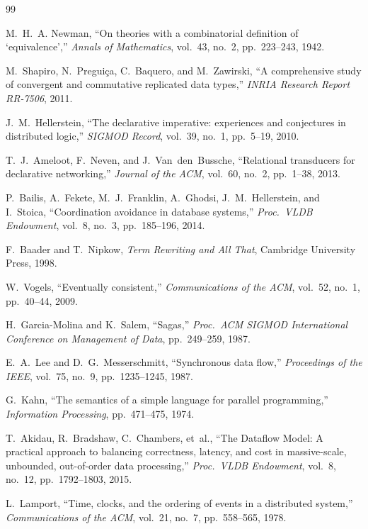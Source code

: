 \documentclass[11pt,a4paper]{article}
\theoremstyle{plain}
\theoremstyle{definition}
\theoremstyle{remark}
\begin{document}
\begin{thebibliography}{99}

M.~H.~A. Newman,
``On theories with a combinatorial definition of `equivalence',''
\emph{Annals of Mathematics}, vol.~43, no.~2, pp.~223--243, 1942.

M.~Shapiro, N.~Pregui\c{c}a, C.~Baquero, and M.~Zawirski,
``A comprehensive study of convergent and commutative replicated data types,''
\emph{INRIA Research Report RR-7506}, 2011.

J.~M.~Hellerstein,
``The declarative imperative: experiences and conjectures in distributed logic,''
\emph{SIGMOD Record}, vol.~39, no.~1, pp.~5--19, 2010.

T.~J.~Ameloot, F.~Neven, and J.~Van~den~Bussche,
``Relational transducers for declarative networking,''
\emph{Journal of the ACM}, vol.~60, no.~2, pp.~1--38, 2013.

P.~Bailis, A.~Fekete, M.~J.~Franklin, A.~Ghodsi, J.~M.~Hellerstein, and I.~Stoica,
``Coordination avoidance in database systems,''
\emph{Proc.\ VLDB Endowment}, vol.~8, no.~3, pp.~185--196, 2014.

F.~Baader and T.~Nipkow,
\emph{Term Rewriting and All That},
Cambridge University Press, 1998.

W.~Vogels,
``Eventually consistent,''
\emph{Communications of the ACM}, vol.~52, no.~1, pp.~40--44, 2009.

H.~Garcia-Molina and K.~Salem,
``Sagas,''
\emph{Proc.\ ACM SIGMOD International Conference on Management of Data}, pp.~249--259, 1987.

E.~A.~Lee and D.~G.~Messerschmitt,
``Synchronous data flow,''
\emph{Proceedings of the IEEE}, vol.~75, no.~9, pp.~1235--1245, 1987.

G.~Kahn,
``The semantics of a simple language for parallel programming,''
\emph{Information Processing}, pp.~471--475, 1974.

T.~Akidau, R.~Bradshaw, C.~Chambers, et~al.,
``The Dataflow Model: A practical approach to balancing correctness, latency, and cost in massive-scale, unbounded, out-of-order data processing,''
\emph{Proc.\ VLDB Endowment}, vol.~8, no.~12, pp.~1792--1803, 2015.

L.~Lamport,
``Time, clocks, and the ordering of events in a distributed system,''
\emph{Communications of the ACM}, vol.~21, no.~7, pp.~558--565, 1978.


\end{thebibliography}
\end{document}
